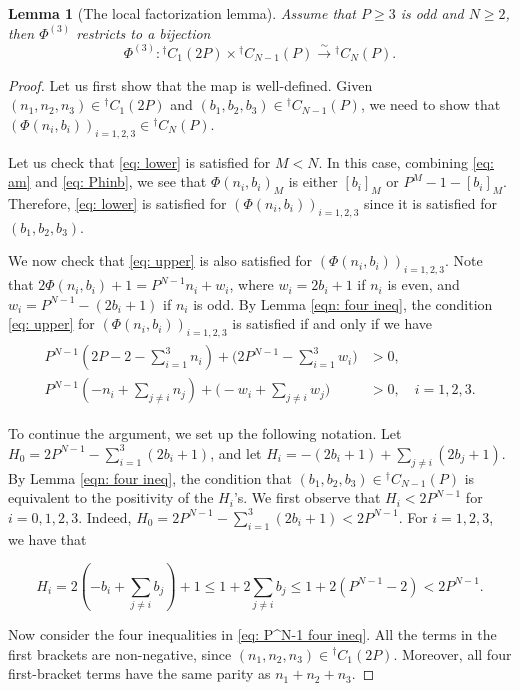 \documentclass[11pt]{amsart}
\newtheorem{lemma}[theorem]{Lemma}
\begin{document}
\begin{lemma}[The local factorization lemma]\label{lm: local fac}
    Assume that $P\geq 3$ is odd and $N\geq 2$, then $\Phi^{(3)}$ restricts to a bijection
    \begin{equation}
        \Phi^{(3)}: {}^\dagger C_1(2P)\times {}^\dagger C_{N-1}(P)\xrightarrow{\sim} {}^\dagger C_N(P).
    \end{equation}
\end{lemma}
\begin{proof}
    Let us first show that the map is well-defined.
    Given $(n_1,n_2,n_3)\in {}^\dagger C_1(2P)$ and $(b_1,b_2,b_3)\in {}^\dagger C_{N-1}(P)$, we need to show that $(\Phi(n_i,b_i))_{i=1,2,3}\in {}^\dagger C_N(P)$.

    Let us check that \eqref{eq: lower} is satisfied for $M<N$.
    In this case, combining \eqref{eq: am} and \eqref{eq: Phinb}, we see that $\Phi(n_i,b_i)_M$ is either $[b_i]_M$ or $P^M-1-[b_i]_M$.
    Therefore, \eqref{eq: lower} is satisfied for $(\Phi(n_i,b_i))_{i=1,2,3}$ since it is satisfied for $(b_1,b_2,b_3)$. 
    

    We now check that \eqref{eq: upper} is also satisfied for $(\Phi(n_i,b_i))_{i=1,2,3}$.
Note that  $2\Phi(n_i,b_i)+1=P^{N-1}n_i+w_i$, where $w_i=2b_i+1$ if $n_i$ is even, and $w_i=P^{N-1}-(2b_i+1)$ if $n_i$ is odd.
By Lemma \ref{eqn: four ineq}, the condition \eqref{eq: upper} for $(\Phi(n_i,b_i))_{i=1,2,3}$ is satisfied if and only if we have 
\begin{align}\label{eq: P^N-1 four ineq}
\begin{split}
    P^{N-1}(2P-2-\sum_{i=1}^3 n_i)+\Big(2P^{N-1}-\sum_{i=1}^3 w_i\Big)&>0,\\
    P^{N-1}(-n_i+\sum_{j\neq i}n_j)+\Big(-w_i+\sum_{j\neq i}w_j\Big)&>0,\quad i=1,2,3.
\end{split}
\end{align}


To continue the argument, we set up the following notation.
Let $H_0=2P^{N-1}-\sum_{i=1}^3(2b_i+1)$, and let $H_i=-(2b_i+1)+\sum_{j\neq i}(2b_j+1)$. 
By Lemma \ref{eqn: four ineq}, the condition that $(b_1,b_2,b_3)\in {}^\dagger C_{N-1}(P)$ is equivalent to the positivity of the $H_i$'s.
We first observe that $H_i<2P^{N-1}$ for $i=0,1,2,3$.  Indeed, $H_0=2P^{N-1}-\sum_{i=1}^3(2b_i+1)<2P^{N-1}$.
For $i=1,2,3$, we have that

\[H_i=2(-b_i+\sum_{j\neq i}b_j)+1\leq 1+2\sum_{j\neq i}b_j\leq 1+2(P^{N-1}-2)<2P^{N-1}.\]

Now consider the four inequalities in \eqref{eq: P^N-1 four ineq}.
All the terms in the first brackets are non-negative, since
$(n_1,n_2,n_3)\in{}^\dagger C_1(2P)$.
Moreover, all four first-bracket terms
have the same parity as $n_1+n_2+n_3$.


\end{proof}
\end{document}
